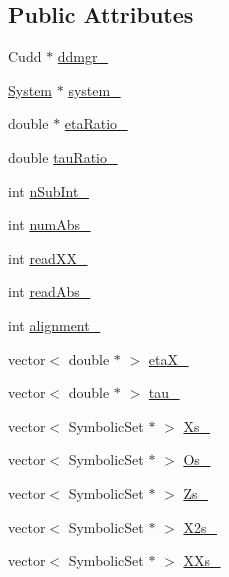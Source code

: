 \subsection*{Public Attributes}
\begin{DoxyCompactItemize}
\item 
Cudd $\ast$ \hyperlink{classscots_1_1Adaptive_a9e6666734880dba708dd931348041274}{ddmgr\+\_\+}
\item 
\hyperlink{classscots_1_1System}{System} $\ast$ \hyperlink{classscots_1_1Adaptive_a3c9f6e3b1ae0c7bcabeafb28732d67ab}{system\+\_\+}
\item 
double $\ast$ \hyperlink{classscots_1_1Adaptive_af0ae9692bf76a9d38cca670e9535310f}{eta\+Ratio\+\_\+}
\item 
double \hyperlink{classscots_1_1Adaptive_a33592a853774854552908de4762f8f8c}{tau\+Ratio\+\_\+}
\item 
int \hyperlink{classscots_1_1Adaptive_a8279bfd4ed3ffa12cc1775ee66cf0e21}{n\+Sub\+Int\+\_\+}
\item 
int \hyperlink{classscots_1_1Adaptive_afdd5a499494efeb8538346ad9e0f329c}{num\+Abs\+\_\+}
\item 
int \hyperlink{classscots_1_1Adaptive_a95926f102459b6ec3525040c791ff359}{read\+X\+X\+\_\+}
\item 
int \hyperlink{classscots_1_1Adaptive_a8c2a7e89feeb75f0b51fdf9c8d1359e7}{read\+Abs\+\_\+}
\item 
int \hyperlink{classscots_1_1Adaptive_ad4f525a5a65b284da14369a54532cf39}{alignment\+\_\+}
\item 
vector$<$ double $\ast$ $>$ \hyperlink{classscots_1_1Adaptive_abe9d5faea4bd01753070599200e224c5}{eta\+X\+\_\+}
\item 
vector$<$ double $\ast$ $>$ \hyperlink{classscots_1_1Adaptive_a2276dbf06b4db12739aed70443c1a32d}{tau\+\_\+}
\item 
vector$<$ Symbolic\+Set $\ast$ $>$ \hyperlink{classscots_1_1Adaptive_ae43471177bc6b7d3229a9497b46ee343}{Xs\+\_\+}
\item 
vector$<$ Symbolic\+Set $\ast$ $>$ \hyperlink{classscots_1_1Adaptive_abed6bfd1256157d4b943078f6486ee36}{Os\+\_\+}
\item 
vector$<$ Symbolic\+Set $\ast$ $>$ \hyperlink{classscots_1_1Adaptive_a387e00a300c8c75d3a4eb6181dfab9c4}{Zs\+\_\+}
\item 
vector$<$ Symbolic\+Set $\ast$ $>$ \hyperlink{classscots_1_1Adaptive_a532d1acf3db0235c7bbd551b41a040fc}{X2s\+\_\+}
\item 
vector$<$ Symbolic\+Set $\ast$ $>$ \hyperlink{classscots_1_1Adaptive_a3c52621889e3ea22c888c93cd14e5a76}{X\+Xs\+\_\+}

\end{DoxyCompactItemize}

